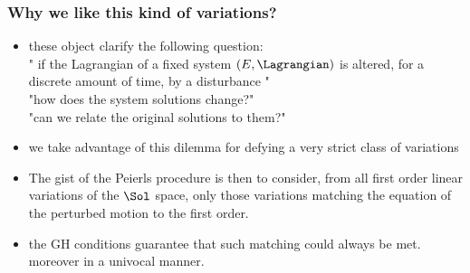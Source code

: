 \documentclass[a4paper,11pt]{scrartcl}
\begin{document}
            \subsubsection*{Why we like this kind of variations?}
        \begin{itemize}
            \item these object clarify the following question:\\
            " if the Lagrangian of a fixed system $(E,\Lagrangian)$ is altered, for a discrete amount of time, by a disturbance " \\
            "how does the system solutions change?"\\
            "can we relate the original solutions to them?"
            \item  we take advantage of this dilemma for defying a very strict class of variations
            \item The gist of the Peierls procedure is then to consider, from all first order linear variations of the $\Sol$ space, only those variations matching the equation of the perturbed motion to the first order.
            \item the GH conditions guarantee that such matching could always be met. \\
            moreover in a univocal manner.
           \end{itemize}
\end{document}

